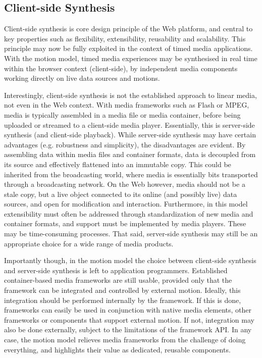 \subsection{Client-side Synthesis}

Client-side synthesis is core design principle of the Web platform, and
central to key properties such as flexibility, extensibility, reusability and
scalability. This principle may now be fully exploited in the context of timed
media applications. With the motion model, timed media experiences
may be synthesised in real time within the browser context (client-side), by
independent media components working directly on live data sources and
motions.

Interestingly, client-side synthesis is not the established approach to linear
media, not even in the Web context. With media frameworks such as Flash or
MPEG, media is typically assembled in a media file or media container, before
being uploaded or streamed to a client-side media player. Essentially, this is
server-side synthesis (and client-side playback). While server-side synthesis
may have certain advantages (e.g. robustness and simplicity), the
disadvantages are evident. By assembling data within media files and container
formats, data is decoupled from its source and effectively flattened into an
immutable copy. This could be inherited from the broadcasting world, where
media is essentially bits transported through a broadcasting network. On the
Web however, media should not be a stale copy, but a live object connected to
its online (and possibly live) data sources, and open for modification and
interaction. Furthermore, in this model extensibility must often be addressed
through standardization of new media and container formats, and support must
be implemented by media players. These may be time-consuming processes. That
said, server-side synthesis may still be an appropriate choice for a wide
range of media products.

Importantly though, in the motion model the choice between client-side 
synthesis and server-side synthesis is left to application programmers.
Established container-based media frameworks are still usable, provided only
that the framework can be integrated and controlled by external motion.
Ideally, this integration should be performed internally by the framework. If
this is done, frameworks can easily be used in conjunction with native media
elements, other frameworks or components that support external motion. If not,
integration may also be done externally, subject to the limitations of the
framework API. In any case, the motion model relieves media
frameworks from the challenge of doing everything, and highlights their value
as dedicated, reusable components.
